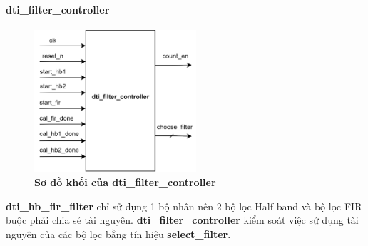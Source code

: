 \paragraph{dti\_filter\_controller}
\begin{figure}[H]
    \centering
    \includegraphics[width=6cm]{Images/Chuong4/hb_fir/control-top.png}
    \caption[Sơ đồ khối của dti\_filter\_controller]{\bfseries \fontsize{12pt}{0pt}\selectfont Sơ đồ khối của dti\_filter\_controller}
    \label{control_t}
\end{figure}
\textbf{dti\_hb\_fir\_filter} chỉ sử dụng 1 bộ nhân nên 2 bộ lọc Half band và bộ lọc FIR buộc phải chia sẻ tài nguyên. \textbf{dti\_filter\_controller} kiểm soát việc sử dụng tài nguyên của các bộ lọc bằng tín hiệu \textbf{select\_filter}.

